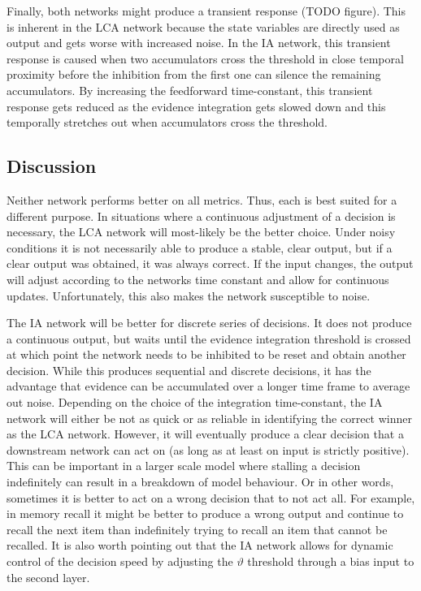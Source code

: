 Finally, both networks might produce a transient response (TODO figure).
This is inherent in the LCA network because the state variables are directly used as output and gets worse with increased noise.
In the IA network, this transient response is caused when two accumulators cross the threshold in close temporal proximity before the inhibition from the first one can silence the remaining accumulators.
By increasing the feedforward time-constant, this transient response gets reduced as the evidence integration gets slowed down and this temporally stretches out when accumulators cross the threshold.


\subsection{Discussion}
Neither network performs better on all metrics.
Thus, each is best suited for a different purpose.
In situations where a continuous adjustment of a decision is necessary, the LCA network will most-likely be the better choice.
Under noisy conditions it is not necessarily able to produce a stable, clear output, but if a clear output was obtained, it was always correct.
If the input changes, the output will adjust according to the networks time constant and allow for continuous updates.
Unfortunately, this also makes the network susceptible to noise.

The IA network will be better for discrete series of decisions.
It does not produce a continuous output, but waits until the evidence integration threshold is crossed at which point the network needs to be inhibited to be reset and obtain another decision.
While this produces sequential and discrete decisions, it has the advantage that evidence can be accumulated over a longer time frame to average out noise.
Depending on the choice of the integration time-constant, the IA network will either be not as quick or as reliable in identifying the correct winner as the LCA network.
However, it will eventually produce a clear decision that a downstream network can act on (as long as at least on input is strictly positive).
This can be important in a larger scale model where stalling a decision indefinitely can result in a breakdown of model behaviour.
Or in other words, sometimes it is better to act on a wrong decision that to not act all.
For example, in memory recall it might be better to produce a wrong output and continue to recall the next item than indefinitely trying to recall an item that cannot be recalled.
It is also worth pointing out that the IA network allows for dynamic control of the decision speed by adjusting the $\vartheta$ threshold through a bias input to the second layer.

